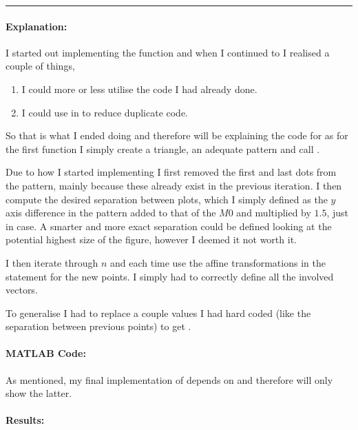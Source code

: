 \bigskip
\hrule


\paragraph{Explanation:}
I started out implementing the  function and when I
continued to  I realised a couple of things,
\begin{enumerate}
    \item I could more or less utilise the code I had already done.
    \item I could use  in  to reduce
        duplicate code.
\end{enumerate}
So that is what I ended doing and therefore will be explaining the
code for  as for the first function I simply create a
triangle, an adequate pattern and call .

Due to how I started implementing  I first removed the
first and last dots from the pattern, mainly because these already
exist in the previous iteration.
I then compute the desired separation between plots, which I simply
defined as the $ y $ axis difference in the pattern added to that of
the $ M0 $ and multiplied by $ 1.5 $, just in case.
A smarter and more exact separation could be defined looking at the
potential highest size of the figure, however I deemed it not worth it.

I then iterate through $ n $ and each time use the affine
transformations in the statement for the new points.
I simply had to correctly define all the involved vectors.

To generalise  I had to replace a couple values I
had hard coded (like the separation between previous points) to get
.

\paragraph{MATLAB Code:}

As mentioned, my final implementation of  depends on
 and therefore will only show the latter.

\begin{tiny}
    
\end{tiny}

\paragraph{Results:}

